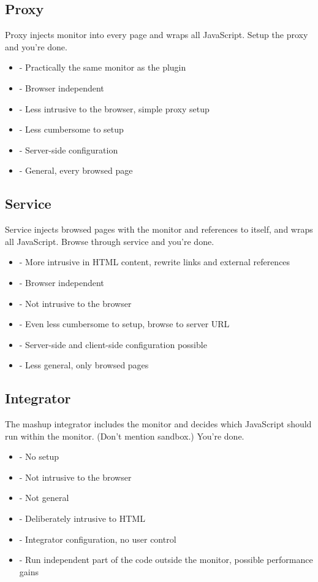 \documentclass{llncs}
\begin{document}

\subsection{Proxy}

Proxy injects monitor into every page and wraps all JavaScript. Setup the proxy 
and you're done.
\begin{itemize}
\item- Practically the same monitor as the plugin
\item- Browser independent
\item- Less intrusive to the browser, simple proxy setup
\item- Less cumbersome to setup
\item- Server-side configuration
\item- General, every browsed page
\end{itemize}

\subsection{Service}

Service injects browsed pages with the monitor and references to itself, and 
wraps all JavaScript. Browse through service and you're done.
\begin{itemize}
\item- More intrusive in HTML content, rewrite links and external references 
\item- Browser independent
\item- Not intrusive to the browser
\item- Even less cumbersome to setup, browse to server URL
\item- Server-side and client-side configuration possible
\item- Less general, only browsed pages
\end{itemize}

\subsection{Integrator}

The mashup integrator includes the monitor and decides which JavaScript should 
run within the monitor. (Don't mention sandbox.) You're done.
\begin{itemize}
\item- No setup
\item- Not intrusive to the browser
\item- Not general
\item- Deliberately intrusive to HTML
\item- Integrator configuration, no user control
\item- Run independent part of the code outside the monitor, possible performance gains
\end{itemize}
\end{document}
